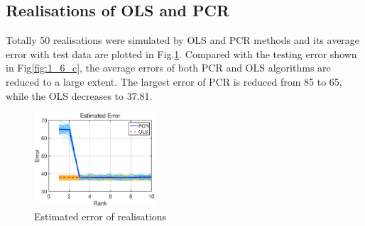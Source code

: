 \subsection{Realisations of OLS and PCR}
Totally 50 realisations were simulated by OLS and PCR methods and its average error with test data are plotted in Fig.\ref{fig:1_6_d}. Compared with the testing error shown in Fig\ref{fig:1_6_c}, the average errors of both PCR and OLS algorithms are reduced to a large extent. The largest error of PCR is reduced from 85 to 65, while the OLS decreases to 37.81.
\vspace*{3in}
\begin{figure}[t!]
    \centering
    \includegraphics[width=0.4\textwidth]{fig/16/16d.eps}
    \caption{Estimated error of realisations}
    \label{fig:1_6_d}
\end{figure}


